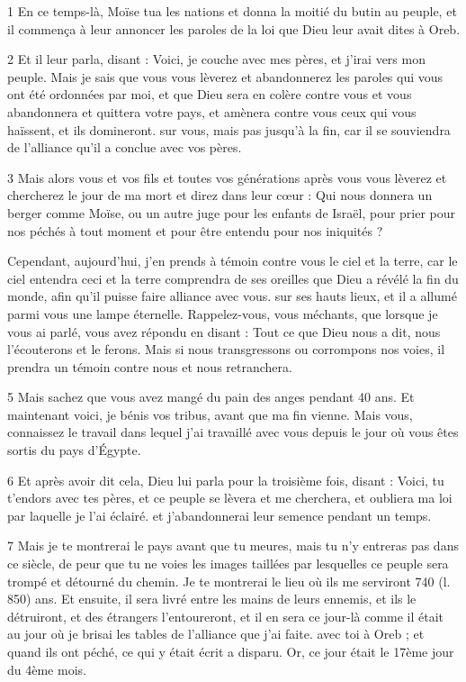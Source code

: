 \par 1 En ce temps-là, Moïse tua les nations et donna la moitié du butin au peuple, et il commença à leur annoncer les paroles de la loi que Dieu leur avait dites à Oreb.

\par 2 Et il leur parla, disant : Voici, je couche avec mes pères, et j'irai vers mon peuple. Mais je sais que vous vous lèverez et abandonnerez les paroles qui vous ont été ordonnées par moi, et que Dieu sera en colère contre vous et vous abandonnera et quittera votre pays, et amènera contre vous ceux qui vous haïssent, et ils domineront. sur vous, mais pas jusqu'à la fin, car il se souviendra de l'alliance qu'il a conclue avec vos pères.

\par 3 Mais alors vous et vos fils et toutes vos générations après vous vous lèverez et chercherez le jour de ma mort et direz dans leur cœur : Qui nous donnera un berger comme Moïse, ou un autre juge pour les enfants de Israël, pour prier pour nos péchés à tout moment et pour être entendu pour nos iniquités ?

\par Cependant, aujourd'hui, j'en prends à témoin contre vous le ciel et la terre, car le ciel entendra ceci et la terre comprendra de ses oreilles que Dieu a révélé la fin du monde, afin qu'il puisse faire alliance avec vous. sur ses hauts lieux, et il a allumé parmi vous une lampe éternelle. Rappelez-vous, vous méchants, que lorsque je vous ai parlé, vous avez répondu en disant : Tout ce que Dieu nous a dit, nous l'écouterons et le ferons. Mais si nous transgressons ou corrompons nos voies, il prendra un témoin contre nous et nous retranchera.

\par 5 Mais sachez que vous avez mangé du pain des anges pendant 40 ans. Et maintenant voici, je bénis vos tribus, avant que ma fin vienne. Mais vous, connaissez le travail dans lequel j'ai travaillé avec vous depuis le jour où vous êtes sortis du pays d'Égypte.

\par 6 Et après avoir dit cela, Dieu lui parla pour la troisième fois, disant : Voici, tu t'endors avec tes pères, et ce peuple se lèvera et me cherchera, et oubliera ma loi par laquelle je l'ai éclairé. et j'abandonnerai leur semence pendant un temps.

\par 7 Mais je te montrerai le pays avant que tu meures, mais tu n'y entreras pas dans ce siècle, de peur que tu ne voies les images taillées par lesquelles ce peuple sera trompé et détourné du chemin. Je te montrerai le lieu où ils me serviront 740 (l. 850) ans. Et ensuite, il sera livré entre les mains de leurs ennemis, et ils le détruiront, et des étrangers l'entoureront, et il en sera ce jour-là comme il était au jour où je brisai les tables de l'alliance que j'ai faite. avec toi à Oreb ; et quand ils ont péché, ce qui y était écrit a disparu. Or, ce jour était le 17ème jour du 4ème mois.

